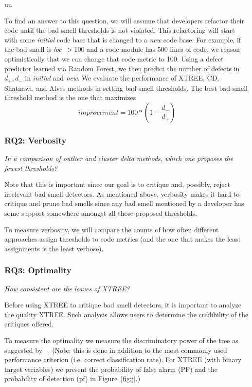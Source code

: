 uu \documentclass[final,twocolumn,5p]{elsarticle}
\newcommand{\fig}[1]{Figure~\ref{fig:#1}}
\theoremstyle{break}
\begin{document}
\begin{itemize}
To find an answer to this question, we will assume that developers
refactor their code until the bad smell thresholds is not violated.
This refactoring will start with some {\em initial} code
base that is changed to a {\em new} code base. 
For example, if the bad smell is \mbox{{\em loc $>100$}} and a 
code module has 500 lines of code, we reason
optimistically that we can change that code metric
to 100.  
Using a defect
predictor learned via Random Forest, we then predict the
number of defects in $d_+,d_-$ in {\em initial} and {\em new}. We evaluate the performance of XTREE, CD, Shatnawi, and Alves methods in setting bad smell thresholds.
The best bad smell threshold method is the one that maximizes
\begin{equation}\label{eq:diff}
\mathit{improvement} = 100* \left(1 - \frac{ d_- }{ d_+}\right)
\end{equation}

\subsubsection{RQ2: Verbosity} 

{\em In a comparison of    outlier and cluster delta
methods, which one proposes the fewest thresholds?}

Note that this is important since our goal is to critique and, possibly,
reject irrelevant bad smell detectors. As mentioned above,
  verbosity makes it hard   to critique and prune bad smells
since any bad smell mentioned by a developer has some support
somewhere amongst all those proposed thresholds. 

To measure verbosity, we will compare the counts of how often
different approaches assign thresholds to code metrics
(and the one that makes the least assignments is the least verbose).

\subsubsection{RQ3: Optimality}  

{\em How consistent are the leaves of XTREE?}

Before using XTREE to critique bad smell detectors, it is important to analyze the quality XTREE. Such analysis allows users to determine the credibility of the critiques offered. 

To measure the optimality we measure the discriminatory power of the tree as suggested by ~\cite{osei04}. (Note: this is done in addition to the most commonly used performance criterion (i.e.
correct classification rate). For XTREE (with binary target variables) we present the probability of false alarm (PF) and the probability of detection (pf) in \fig{j}.)



\end{itemize}
\end{document}
